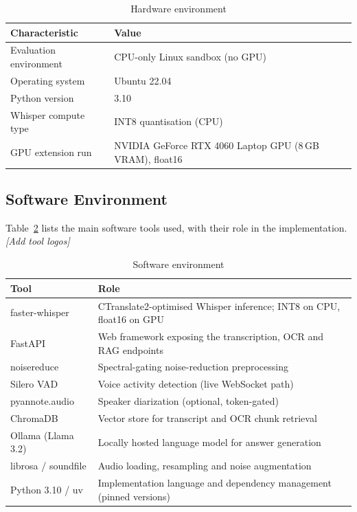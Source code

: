 \documentclass[12pt]{report}
\newcommand{\todo}[1]{\textsl{\colorbox[rgb]{1,1,0}{#1}}}
\begin{document}
\begin{table}[H]
\centering
\begin{tabular}{|l|l|}
\hline
\textbf{Characteristic} & \textbf{Value} \\ \hline
Evaluation environment & CPU-only Linux sandbox (no GPU) \\ \hline
Operating system & Ubuntu 22.04 \\ \hline
Python version & 3.10 \\ \hline
Whisper compute type & INT8 quantisation (CPU) \\ \hline
GPU extension run & NVIDIA GeForce RTX 4060 Laptop GPU (8\,GB VRAM), float16 \\ \hline
\end{tabular}
\caption{Hardware environment}
\label{tab:hardware}
\end{table}

\subsection{Software Environment}

Table~\ref{tab:software} lists the main software tools used, with their role in the implementation. \todo{[Add tool logos]}

\begin{table}[H]
\centering
\small
\begin{tabular}{|l|p{9.5cm}|}
\hline
\textbf{Tool} & \textbf{Role} \\ \hline
faster-whisper & CTranslate2-optimised Whisper inference; INT8 on CPU, float16 on GPU \\ \hline
FastAPI & Web framework exposing the transcription, OCR and RAG endpoints \\ \hline
noisereduce & Spectral-gating noise-reduction preprocessing \\ \hline
Silero VAD & Voice activity detection (live WebSocket path) \\ \hline
pyannote.audio & Speaker diarization (optional, token-gated) \\ \hline
ChromaDB & Vector store for transcript and OCR chunk retrieval \\ \hline
Ollama (Llama 3.2) & Locally hosted language model for answer generation \\ \hline
librosa / soundfile & Audio loading, resampling and noise augmentation \\ \hline
Python 3.10 / uv & Implementation language and dependency management (pinned versions) \\ \hline
\end{tabular}
\caption{Software environment}
\label{tab:software}
\end{table}
\end{document}

